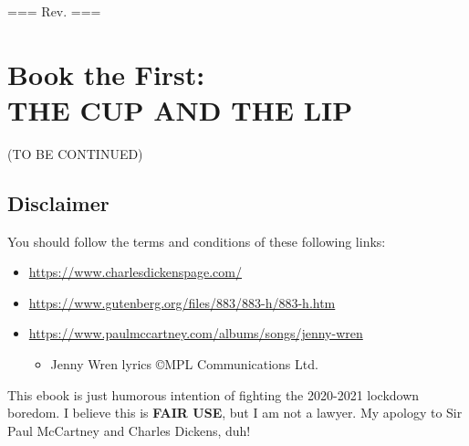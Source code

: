 \documentclass[12pt]{book}
\begin{document}
\noindent
=== Rev. \rev ===

\newpage


\part{Book the First:\\THE CUP AND THE LIP}
















{\LARGE (TO BE CONTINUED)}

\chapter*{Disclaimer}

You should follow the terms and conditions of these following links:
\begin{itemize}
\item \url{https://www.charlesdickenspage.com/}
\item \url{https://www.gutenberg.org/files/883/883-h/883-h.htm}
\item \url{https://www.paulmccartney.com/albums/songs/jenny-wren}
\begin{itemize}
\item Jenny Wren lyrics \copyright MPL Communications Ltd.
\end{itemize}
\end{itemize}

\noindent
This ebook is just humorous intention of fighting the 2020-2021 lockdown boredom.
I believe this is \textbf{FAIR USE}, but I am not a lawyer.
My apology to Sir Paul McCartney and Charles Dickens, duh!

\end{document}
